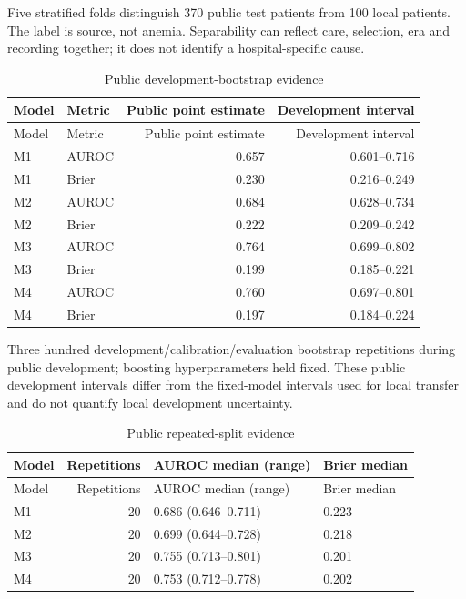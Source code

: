 \documentclass[pdflatex,sn-vancouver-num]{sn-jnl}
\begin{document}
\noindent Five stratified folds distinguish 370 public test patients from 100 local patients. The label is source, not anemia. Separability can reflect care, selection, era and recording together; it does not identify a hospital-specific cause.\par\endgroup
\begingroup\scriptsize\setlength{\tabcolsep}{2pt}
\begin{longtable}{llrr}
\caption{Public development-bootstrap evidence}\label{tab:s16}\\
\toprule
Model & Metric & Public point estimate & Development interval\\\midrule
\endfirsthead
\toprule
Model & Metric & Public point estimate & Development interval\\\midrule
\endhead
\endfoot
\bottomrule\endlastfoot
M1 & AUROC & 0.657 & 0.601--0.716\\
M1 & Brier & 0.230 & 0.216--0.249\\
M2 & AUROC & 0.684 & 0.628--0.734\\
M2 & Brier & 0.222 & 0.209--0.242\\
M3 & AUROC & 0.764 & 0.699--0.802\\
M3 & Brier & 0.199 & 0.185--0.221\\
M4 & AUROC & 0.760 & 0.697--0.801\\
M4 & Brier & 0.197 & 0.184--0.224\\
\end{longtable}
\noindent Three hundred development/calibration/evaluation bootstrap repetitions during public development; boosting hyperparameters held fixed. These public development intervals differ from the fixed-model intervals used for local transfer and do not quantify local development uncertainty.\par\endgroup
\begingroup\scriptsize\setlength{\tabcolsep}{2pt}
\begin{longtable}{lrll}
\caption{Public repeated-split evidence}\label{tab:s17}\\
\toprule
Model & Repetitions & AUROC median (range) & Brier median\\\midrule
\endfirsthead
\toprule
Model & Repetitions & AUROC median (range) & Brier median\\\midrule
\endhead
\endfoot
\bottomrule\endlastfoot
M1 & 20 & 0.686 (0.646--0.711) & 0.223\\
M2 & 20 & 0.699 (0.644--0.728) & 0.218\\
M3 & 20 & 0.755 (0.713--0.801) & 0.201\\
M4 & 20 & 0.753 (0.712--0.778) & 0.202\\
\end{longtable}
\end{document}
